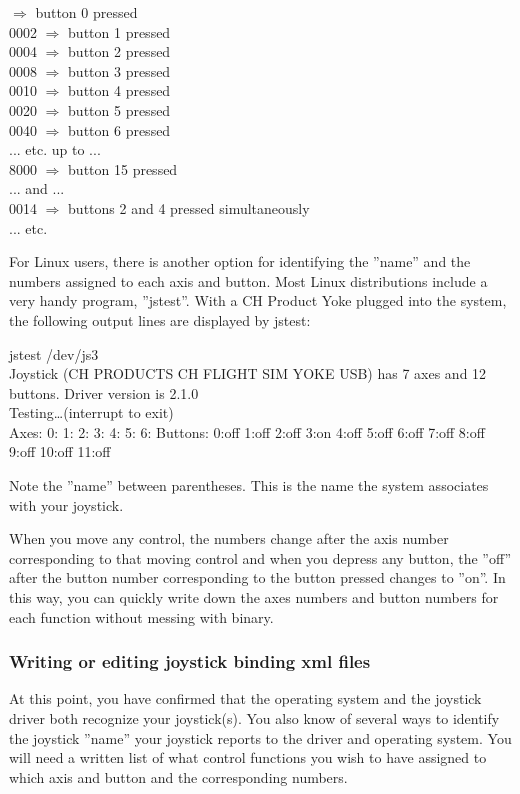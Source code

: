 $\Rightarrow$ button 0 pressed\\
  0002 $\Rightarrow$ button 1 pressed\\
  0004 $\Rightarrow$ button 2 pressed\\
  0008 $\Rightarrow$ button 3 pressed\\
  0010 $\Rightarrow$ button 4 pressed\\
  0020 $\Rightarrow$ button 5 pressed\\
  0040 $\Rightarrow$ button 6 pressed\\
  ... etc. up to ...\\
  8000 $\Rightarrow$ button 15 pressed\\
  ... and ...\\
  0014 $\Rightarrow$ buttons 2 and 4 pressed simultaneously\\
  ... etc.
  \medskip

For Linux users, there is another option for identifying the ''name'' and the numbers assigned to each axis and button.  Most Linux distributions include a very handy program, ''jstest''.  With a CH Product Yoke plugged into the system, the following output lines are displayed by jstest:
\medskip

\begin{ttfamily}
\tiny
\noindent
jstest /dev/js3\\
Joystick (CH PRODUCTS CH FLIGHT SIM YOKE USB) has 7 axes and 12 buttons. Driver version is 2.1.0\\
Testing\ldots (interrupt to exit)\\
Axes:  0:   1:   2:  3:  4:  5:  6: Buttons:  0:off  1:off  2:off  3:on  4:off  5:off  6:off  7:off 8:off 9:off 10:off  11:off\\
\end{ttfamily}

\noindent
Note the ''name'' between parentheses.  This is the name the system associates with your joystick.

When you move any control, the numbers change after the axis number corresponding to that moving control and when you depress any button, the ''off'' after the button number corresponding to the button pressed changes to ''on''.  In this way, you can quickly write down the axes numbers and button numbers for each function without messing with binary.  

\subsubsection{Writing or editing joystick binding xml files\label{writing}}
At this point, you have confirmed that the operating system and the joystick driver both recognize your joystick(s).  You also know of several ways to identify the joystick ''name'' your joystick reports to the driver and operating system.  You will need a written list of what control functions you wish to have assigned to which axis and button and the corresponding numbers.  

